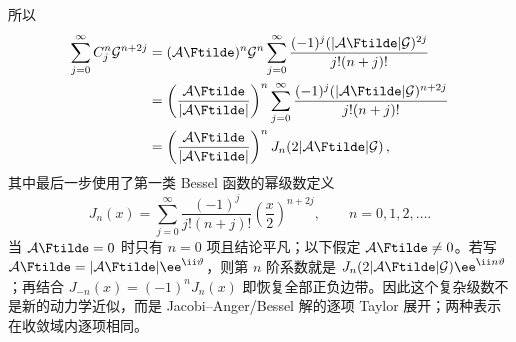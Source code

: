 所以
\begin{align}
\sum_{j=0}^{\infty}C_j^n\mathcal G^{n+2j}
&=(\mathcal A\Ftilde)^n\mathcal G^n
\sum_{j=0}^{\infty}
\frac{(-1)^j(|\mathcal A\Ftilde|\mathcal G)^{2j}}
{j!(n+j)!}\\
&=\left(\frac{\mathcal A\Ftilde}{|\mathcal A\Ftilde|}\right)^n
\sum_{j=0}^{\infty}
\frac{(-1)^j(|\mathcal A\Ftilde|\mathcal G)^{n+2j}}
{j!(n+j)!}\\
&=\left(\frac{\mathcal A\Ftilde}{|\mathcal A\Ftilde|}\right)^n
J_n\!\left(2|\mathcal A\Ftilde|\mathcal G\right),
\label{eq:Taylor-to-Bessel-explicit}
\end{align}
其中最后一步使用了第一类 Bessel 函数的幂级数定义
\begin{equation}
J_n(x)=\sum_{j=0}^{\infty}
\frac{(-1)^j}{j!(n+j)!}\left(\frac{x}{2}\right)^{n+2j},
\qquad n=0,1,2,\ldots.
\label{eq:Bessel-series-definition}
\end{equation}
当 $\mathcal A\Ftilde=0$ 时只有 $n=0$ 项且结论平凡；以下假定 $\mathcal A\Ftilde\neq0$。若写 $\mathcal A\Ftilde=|\mathcal A\Ftilde|\ee^{\ii\vartheta}$，则第 $n$ 阶系数就是 $J_n(2|\mathcal A\Ftilde|\mathcal G)\ee^{\ii n\vartheta}$；再结合 $J_{-n}(x)=(-1)^nJ_n(x)$ 即恢复全部正负边带。因此这个复杂级数不是新的动力学近似，而是 Jacobi--Anger/Bessel 解的逐项 Taylor 展开；两种表示在收敛域内逐项相同。


